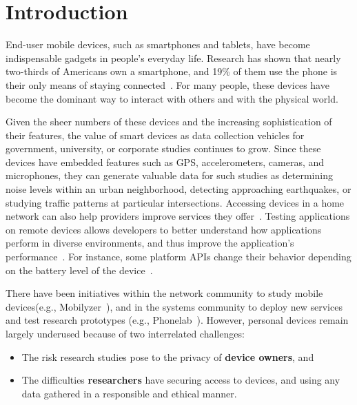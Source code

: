 \section{Introduction}

End-user mobile devices, such as smartphones and tablets, have become
indispensable gadgets in people's everyday life. %
Research has shown that nearly two-thirds of
Americans own a smartphone, and 19\% of them
use the phone is their only means of staying connected~\cite{phone2015}. 
For many people, these devices have become the dominant way to
interact with others and with the physical world.

Given the sheer numbers of these devices and the increasing
sophistication of their features,
the value of smart devices as data collection vehicles for government,
university, or corporate studies continues to grow. Since
these devices have embedded features such as GPS,
accelerometers, cameras, and microphones, they can generate valuable
data for such studies as determining noise levels within an urban
neighborhood, detecting approaching earthquakes, or studying traffic
patterns at particular intersections. Accessing devices in a home
network can also help providers improve services they 
offer~\cite{sundaresan2011broadband}. Testing applications on remote
devices allows developers to better understand how applications 
perform in diverse environments, and thus improve the application's 
performance~\cite{ravindranath2012appinsight}. For instance, 
some platform APIs change their behavior depending 
on the battery level of the device~\cite{battery}. 

There have been initiatives within the network
community to study mobile devices(e.g.,
Mobilyzer~\cite{nikravesh2015mobilyzer}), and in the systems community
to deploy new services and test research prototypes (e.g.,
Phonelab~\cite{phonelab, nandugudi2013phonelab}). However, personal devices
remain largely underused because of two interrelated challenges:

\begin{itemize}
\setlength\itemsep{0em}
\item The risk research studies pose to the privacy of \textbf{device 
owners}, and

\item The difficulties \textbf{researchers} have
securing access to devices, and using any data gathered in a
responsible and ethical manner. 
\end{itemize}
					
